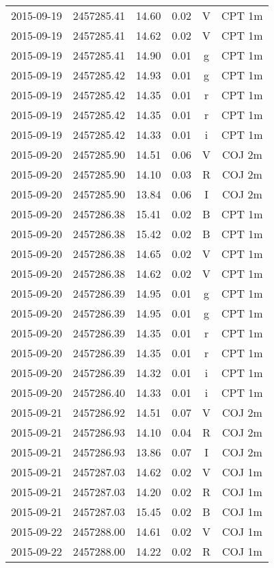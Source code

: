 \begin{table}
\begin{tabular}{cccccc}
2015-09-19 & 2457285.41 & 14.60 & 0.02 & V & CPT 1m \\
2015-09-19 & 2457285.41 & 14.62 & 0.02 & V & CPT 1m \\
2015-09-19 & 2457285.41 & 14.90 & 0.01 & g & CPT 1m \\
2015-09-19 & 2457285.42 & 14.93 & 0.01 & g & CPT 1m \\
2015-09-19 & 2457285.42 & 14.35 & 0.01 & r & CPT 1m \\
2015-09-19 & 2457285.42 & 14.35 & 0.01 & r & CPT 1m \\
2015-09-19 & 2457285.42 & 14.33 & 0.01 & i & CPT 1m \\
2015-09-20 & 2457285.90 & 14.51 & 0.06 & V & COJ 2m \\
2015-09-20 & 2457285.90 & 14.10 & 0.03 & R & COJ 2m \\
2015-09-20 & 2457285.90 & 13.84 & 0.06 & I & COJ 2m \\
2015-09-20 & 2457286.38 & 15.41 & 0.02 & B & CPT 1m \\
2015-09-20 & 2457286.38 & 15.42 & 0.02 & B & CPT 1m \\
2015-09-20 & 2457286.38 & 14.65 & 0.02 & V & CPT 1m \\
2015-09-20 & 2457286.38 & 14.62 & 0.02 & V & CPT 1m \\
2015-09-20 & 2457286.39 & 14.95 & 0.01 & g & CPT 1m \\
2015-09-20 & 2457286.39 & 14.95 & 0.01 & g & CPT 1m \\
2015-09-20 & 2457286.39 & 14.35 & 0.01 & r & CPT 1m \\
2015-09-20 & 2457286.39 & 14.35 & 0.01 & r & CPT 1m \\
2015-09-20 & 2457286.39 & 14.32 & 0.01 & i & CPT 1m \\
2015-09-20 & 2457286.40 & 14.33 & 0.01 & i & CPT 1m \\
2015-09-21 & 2457286.92 & 14.51 & 0.07 & V & COJ 2m \\
2015-09-21 & 2457286.93 & 14.10 & 0.04 & R & COJ 2m \\
2015-09-21 & 2457286.93 & 13.86 & 0.07 & I & COJ 2m \\
2015-09-21 & 2457287.03 & 14.62 & 0.02 & V & COJ 1m \\
2015-09-21 & 2457287.03 & 14.20 & 0.02 & R & COJ 1m \\
2015-09-21 & 2457287.03 & 15.45 & 0.02 & B & COJ 1m \\
2015-09-22 & 2457288.00 & 14.61 & 0.02 & V & COJ 1m \\
2015-09-22 & 2457288.00 & 14.22 & 0.02 & R & COJ 1m \\

\end{tabular}
\end{table}
